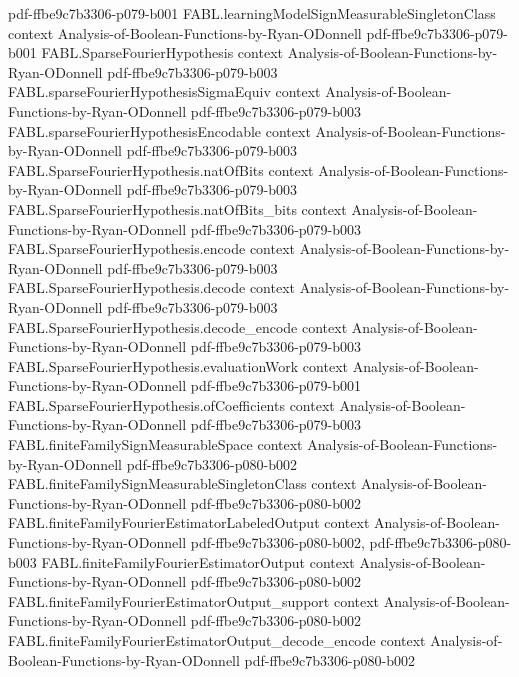 \begin{theorem}
  {pdf-ffbe9c7b3306-p079-b001}
\proofstep
  {FABL.learningModelSignMeasurableSingletonClass}
  {context}
  {Analysis-of-Boolean-Functions-by-Ryan-ODonnell}
  {pdf-ffbe9c7b3306-p079-b001}
\proofstep
  {FABL.SparseFourierHypothesis}
  {context}
  {Analysis-of-Boolean-Functions-by-Ryan-ODonnell}
  {pdf-ffbe9c7b3306-p079-b003}
\proofstep
  {FABL.sparseFourierHypothesisSigmaEquiv}
  {context}
  {Analysis-of-Boolean-Functions-by-Ryan-ODonnell}
  {pdf-ffbe9c7b3306-p079-b003}
\proofstep
  {FABL.sparseFourierHypothesisEncodable}
  {context}
  {Analysis-of-Boolean-Functions-by-Ryan-ODonnell}
  {pdf-ffbe9c7b3306-p079-b003}
\proofstep
  {FABL.SparseFourierHypothesis.natOfBits}
  {context}
  {Analysis-of-Boolean-Functions-by-Ryan-ODonnell}
  {pdf-ffbe9c7b3306-p079-b003}
\proofstep
  {FABL.SparseFourierHypothesis.natOfBits_bits}
  {context}
  {Analysis-of-Boolean-Functions-by-Ryan-ODonnell}
  {pdf-ffbe9c7b3306-p079-b003}
\proofstep
  {FABL.SparseFourierHypothesis.encode}
  {context}
  {Analysis-of-Boolean-Functions-by-Ryan-ODonnell}
  {pdf-ffbe9c7b3306-p079-b003}
\proofstep
  {FABL.SparseFourierHypothesis.decode}
  {context}
  {Analysis-of-Boolean-Functions-by-Ryan-ODonnell}
  {pdf-ffbe9c7b3306-p079-b003}
\proofstep
  {FABL.SparseFourierHypothesis.decode_encode}
  {context}
  {Analysis-of-Boolean-Functions-by-Ryan-ODonnell}
  {pdf-ffbe9c7b3306-p079-b003}
\proofstep
  {FABL.SparseFourierHypothesis.evaluationWork}
  {context}
  {Analysis-of-Boolean-Functions-by-Ryan-ODonnell}
  {pdf-ffbe9c7b3306-p079-b001}
\proofstep
  {FABL.SparseFourierHypothesis.ofCoefficients}
  {context}
  {Analysis-of-Boolean-Functions-by-Ryan-ODonnell}
  {pdf-ffbe9c7b3306-p079-b003}
\proofstep
  {FABL.finiteFamilySignMeasurableSpace}
  {context}
  {Analysis-of-Boolean-Functions-by-Ryan-ODonnell}
  {pdf-ffbe9c7b3306-p080-b002}
\proofstep
  {FABL.finiteFamilySignMeasurableSingletonClass}
  {context}
  {Analysis-of-Boolean-Functions-by-Ryan-ODonnell}
  {pdf-ffbe9c7b3306-p080-b002}
\proofstep
  {FABL.finiteFamilyFourierEstimatorLabeledOutput}
  {context}
  {Analysis-of-Boolean-Functions-by-Ryan-ODonnell}
  {pdf-ffbe9c7b3306-p080-b002,
    pdf-ffbe9c7b3306-p080-b003}
\proofstep
  {FABL.finiteFamilyFourierEstimatorOutput}
  {context}
  {Analysis-of-Boolean-Functions-by-Ryan-ODonnell}
  {pdf-ffbe9c7b3306-p080-b002}
\proofstep
  {FABL.finiteFamilyFourierEstimatorOutput_support}
  {context}
  {Analysis-of-Boolean-Functions-by-Ryan-ODonnell}
  {pdf-ffbe9c7b3306-p080-b002}
\proofstep
  {FABL.finiteFamilyFourierEstimatorOutput_decode_encode}
  {context}
  {Analysis-of-Boolean-Functions-by-Ryan-ODonnell}
  {pdf-ffbe9c7b3306-p080-b002}

\end{theorem}
